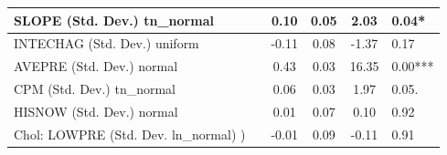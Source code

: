 \begin{table}
\begin{center}
\begin{tabular}{|l|l|c|c|c|l|}
			\hline
			SLOPE (Std. Dev.) tn_normal &  & 0.10 & 0.05 & 2.03 & 0.04* \\
			\hline
			INTECHAG (Std. Dev.) uniform &  & -0.11 & 0.08 & -1.37 & 0.17 \\
			\hline
			AVEPRE (Std. Dev.) normal &  & 0.43 & 0.03 & 16.35 & 0.00*** \\
			\hline
			CPM (Std. Dev.) tn_normal &  & 0.06 & 0.03 & 1.97 & 0.05. \\
			\hline
			HISNOW (Std. Dev.) normal &  & 0.01 & 0.07 & 0.10 & 0.92 \\
			\hline
			 Chol: LOWPRE (Std. Dev. ln_normal) ) &  & -0.01 & 0.09 & -0.11 & 0.91 \\
			\hline
		\end{tabular}
	\end{center}
\end{table}
